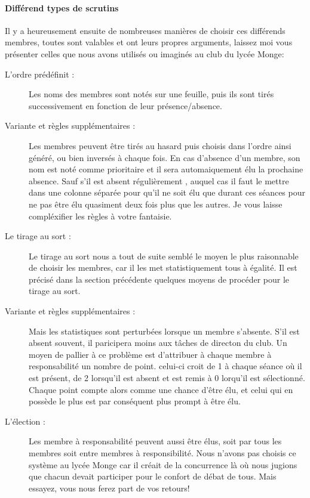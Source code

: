 \documentclass[a4paper,12pt]{article}
\begin{document}
\paragraph{Différend types de scrutins}
Il y a heureusement ensuite de nombreuses manières de choisir ces différends membres, toutes sont valables et ont leurs propres arguments, laissez moi vous présenter celles que nous avons utilisés ou imaginés au club du lycée Monge:
\begin{description}
 \item[L'ordre prédéfinit :] Les noms des membres sont notés sur une feuille, puis ils sont tirés successivement en fonction de leur présence/absence.
 \item[Variante et règles supplémentaires :] Les membres peuvent être tirés au hasard puis choisis dans l'ordre ainsi généré, ou bien inversés à chaque fois. En cas d'absence d'un membre, son nom est noté comme prioritaire et il sera automaiquement élu la prochaine absence. Sauf s'il est absent régulièrement                                     , auquel cas il faut le mettre dans une colonne séparée pour qu'il ne soit élu que durant ces séances pour ne pas être élu quasiment deux fois plus que les autres. Je vous laisse compléxifier les règles à votre fantaisie.
 \item[Le tirage au sort :] Le tirage au sort nous a tout de suite semblé le moyen le plus raisonnable de choisir les membres, car il les met statistiquement tous à égalité. Il est précisé dans la section précédente quelques moyens de procéder pour le tirage au sort.
 \item[Variante et règles supplémentaires :] Mais les statistiques sont perturbées lorsque un membre s'absente. S'il est absent souvent, il paricipera moins aux tâches de directon du club. Un moyen de pallier à ce problème est d'attribuer à chaque membre à responsabilité un nombre de point. celui-ci croit de 1 à chaque séance où il est présent, de 2 lorsqu'il est absent et est remis à 0 lorqu'il est sélectionné. Chaque point compte alors comme une chance d'être élu, et celui qui en possède le plus est par conséquent plus prompt à être élu.
 \item[L'élection :] Les membre à responsabilité peuvent aussi être élus, soit par tous les membres soit entre membres à responsibilité. Nous n'avons pas choisis ce système au lycée Monge car il créait de la concurrence là où nous jugions que chacun devait participer pour le confort de débat de tous. Mais essayez, vous nous ferez part de vos retours!
\end{description}
\end{document}
